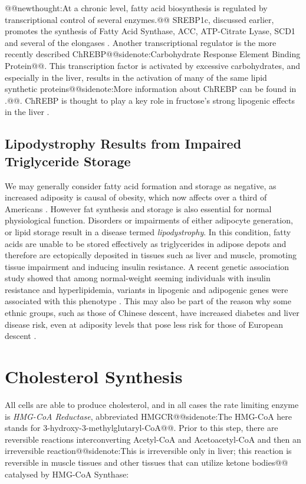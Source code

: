 \documentclass{tufte-handout}
\makeatletter
\def\newthought#1{@@newthought:#1@@}
\def\sidenote#1{@@sidenote:#1@@}
\makeatother
\begin{document}
\newthought{At a chronic level, fatty acid biosynthesis is regulated by transcriptional control of several enzymes.}  SREBP1c, discussed earlier, promotes the synthesis of Fatty Acid Synthase, ACC, ATP-Citrate Lyase, SCD1 and several of the elongases \citep{Horton2002b,Moon2012b}.  Another transcriptional regulator is the more recently described ChREBP\sidenote{Carbohydrate Response Element Binding Protein}.  This transcription factor is activated by excessive carbohydrates, and especially in the liver, results in the activation of many of the same lipid synthetic proteins\sidenote{More information about ChREBP can be found in \citet{Baraille2015}.}.  ChREBP is thought to play a key role in fructose's strong lipogenic effects in the liver \citep{Kim2016d}.

\subsection{Lipodystrophy Results from Impaired Triglyceride Storage}

We may generally consider fatty acid formation and storage as negative, as increased adiposity is causal of obesity, which now affects over a third of Americans \citep{Flegal2016}.  However fat synthesis and storage is also essential for normal physiological function.  Disorders or impairments of either adipocyte generation, or lipid storage result in a disease termed \emph{lipodystrophy}.  In this condition, fatty acids are unable to be stored effectively as triglycerides in adipose depots and therefore are ectopically deposited in tissues such as liver and muscle, promoting tissue impairment and inducing insulin resistance.  A recent genetic association study showed that among normal-weight seeming individuals with insulin resistance and hyperlipidemia, variants in lipogenic and adipogenic genes were associated with this phenotype \citep{Lotta2016a}.  This may also be part of the reason why some ethnic groups, such as those of Chinese descent, have increased diabetes and liver disease risk, even at adiposity levels that pose less risk for those of European descent \citep{Chiu2011a}.

\section{Cholesterol Synthesis}

All cells are able to produce cholesterol, and in all cases the rate limiting enzyme is \emph{HMG-CoA Reductase}, abbreviated HMGCR\sidenote{The HMG-CoA\nomenclature{HMG-CoA}{3-Hydroxy-3-Methylglutaryl-CoA}\index{Metabolites!HMG-CoA} here stands for 3-hydroxy-3-methylglutaryl-CoA}.  Prior to this step, there are reversible reactions interconverting Acetyl-CoA and Acetoacetyl-CoA and then an irreversible reaction\sidenote{This is irreversible only in liver; this reaction is reversible in muscle tissues and other tissues that can utilize ketone bodies} catalysed by HMG-CoA Synthase:
\end{document}
